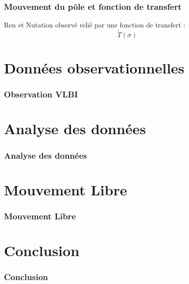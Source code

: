 \documentclass[french]{beamer}
\newcommand{\frtt}[1]{\frametitle{#1}}
\begin{document}
\begin{frame}
  \frtt{Mouvement du pôle et fonction de transfert}
   Ren et Nutation observé relié par une fonction de transfert :
   $$ \tilde{T}(\sigma)  $$
\end{frame}


\section{Données observationnelles}

\begin{frame}
  \frtt{Observation VLBI}
\end{frame}

\section{Analyse des données}

\begin{frame}
  \frtt{Analyse des données}
\end{frame}

\section{Mouvement Libre}
\begin{frame}
  \frtt{Mouvement Libre}
\end{frame}


\section{Conclusion}

\begin{frame}
  \frtt{Conclusion}
\end{frame}
\end{document}
